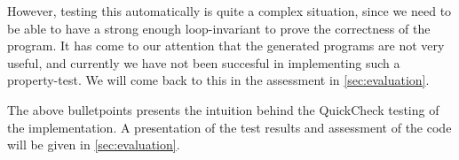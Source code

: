 \begin{itemize}
	However, testing this automatically is quite a complex situation, since we need to be able to have a strong enough loop-invariant to prove the correctness of the program.
	It has come to our attention that the generated programs are not very useful, and currently we have not been succesful in implementing such a property-test. We will come back to this in the assessment in \cref{sec:evaluation}.
\end{itemize}

The above bulletpoints presents the intuition behind the QuickCheck testing of the implementation. A presentation of the test results and assessment of the code will be given in \cref{sec:evaluation}.






















